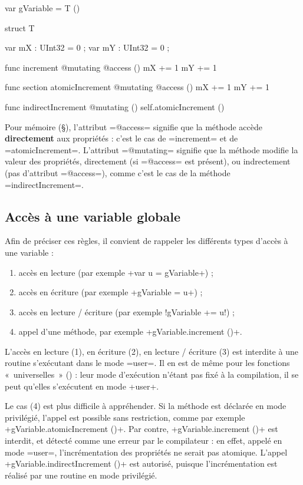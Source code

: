 \begin{PLM}
var gVariable = T ()

struct T {
  var mX : UInt32 = 0 ;
  var mY : UInt32 = 0 ;
  
  func increment @mutating @access () {
    mX += 1
    mY += 1
  }

  func section atomicIncrement @mutating @access () {
    mX += 1
    mY += 1
  }

  func indirectIncrement @mutating () {
    self.atomicIncrement ()
  }
}
\end{PLM}

Pour mémoire (§), l'attribut \plm=@access= signifie que la méthode accède {\bf directement} aux propriétés : c'est le cas de \plm=increment= et de \plm=atomicIncrement=. L'attribut \plm=@mutating= signifie que la méthode modifie la valeur des propriétés, directement (si \plm=@access= est présent), ou indrectement (pas d'attribut \plm=@access=), comme c'est le cas de la méthode \plm=indirectIncrement=.

\subsection{Accès à une variable globale}


Afin de préciser ces règles, il convient de rappeler les différents types d'accès à une variable :
\begin{enumerate}[label=(\arabic*)]
  \item accès en lecture (par exemple \plm+var u = gVariable+) ;
  \item accès en écriture (par exemple \plm+gVariable = u+) ;
  \item accès en lecture / écriture (par exemple \plm!gVariable += u!) ;
  \item appel d'une méthode, par exemple \plm+gVariable.increment ()+.
\end{enumerate}

L'accès en lecture (1), en écriture (2), en lecture / écriture (3) est interdite à une routine s'exécutant dans le mode \plm=user=. Il en est de même pour les fonctions «~universelles~» () : leur mode d'exécution n'étant pas fixé à la compilation, il se peut qu'elles s'exécutent en mode \plm+user+.

Le cas (4) est plus difficile à appréhender. Si la méthode est déclarée en mode privilégié, l'appel est possible sans restriction, comme par exemple \plm+gVariable.atomicIncrement ()+. Par contre, \plm+gVariable.increment ()+ est interdit, et détecté comme une erreur par le compilateur : en effet, appelé en mode \plm=user=, l'incrémentation des propriétés ne serait pas atomique. L'appel \plm+gVariable.indirectIncrement ()+ est autorisé, puisque l'incrémentation est réalisé par une routine en mode privilégié.

